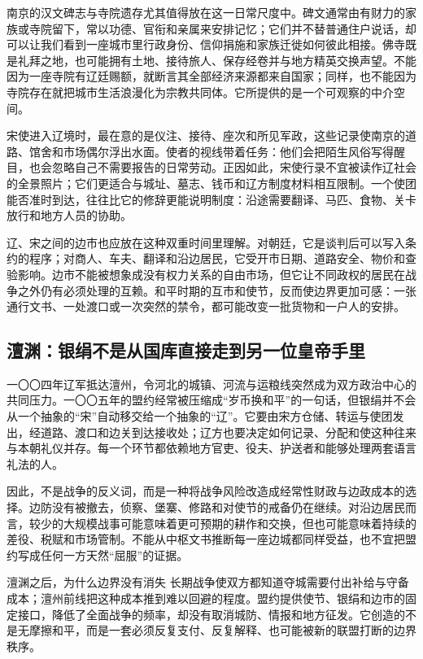 南京的汉文碑志与寺院遗存尤其值得放在这一日常尺度中。碑文通常由有财力的家族或寺院留下，常以功德、官衔和亲属来安排记忆；它们并不替普通住户说话，却可以让我们看到一座城市里行政身份、信仰捐施和家族迁徙如何彼此相接。佛寺既是礼拜之地，也可能拥有土地、接待旅人、保存经卷并与地方精英交换声望。不能因为一座寺院有辽廷赐额，就断言其全部经济来源都来自国家；同样，也不能因为寺院存在就把城市生活浪漫化为宗教共同体。它所提供的是一个可观察的中介空间。

宋使进入辽境时，最在意的是仪注、接待、座次和所见军政，这些记录使南京的道路、馆舍和市场偶尔浮出水面。使者的视线带着任务：他们会把陌生风俗写得醒目，也会忽略自己不需要报告的日常劳动。正因如此，宋使行录不宜被读作辽社会的全景照片；它们更适合与城址、墓志、钱币和辽方制度材料相互限制。一个使团能否准时到达，往往比它的修辞更能说明制度：沿途需要翻译、马匹、食物、关卡放行和地方人员的协助。

辽、宋之间的边市也应放在这种双重时间里理解。对朝廷，它是谈判后可以写入条约的程序；对商人、车夫、翻译和沿边居民，它受开市日期、道路安全、物价和查验影响。边市不能被想象成没有权力关系的自由市场，但它让不同政权的居民在战争之外仍有必须处理的互赖。和平时期的互市和使节，反而使边界更加可感：一张通行文书、一处渡口或一次突然的禁令，都可能改变一批货物和一户人的安排。

\subsection{澶渊：银绢不是从国库直接走到另一位皇帝手里}

一〇〇四年辽军抵达澶州，令河北的城镇、河流与运粮线突然成为双方政治中心的共同压力。一〇〇五年的盟约经常被压缩成“岁币换和平”的一句话，但银绢并不会从一个抽象的“宋”自动移交给一个抽象的“辽”。它要由宋方仓储、转运与使团发出，经道路、渡口和边关到达接收处；辽方也要决定如何记录、分配和使这种往来与本朝礼仪并存。每一个环节都依赖地方官吏、役夫、护送者和能够处理两套语言礼法的人。

因此，不是战争的反义词，而是一种将战争风险改造成经常性财政与边政成本的选择。边防没有被撤去，侦察、堡寨、修路和对使节的戒备仍在继续。对沿边居民而言，较少的大规模战事可能意味着更可预期的耕作和交换，但也可能意味着持续的差役、税赋和市场管制。不能从中枢文书推断每一座边城都同样受益，也不宜把盟约写成任何一方天然“屈服”的证据。

\begin{causalchain}{澶渊之后，为什么边界没有消失}
长期战争使双方都知道夺城需要付出补给与守备成本；澶州前线把这种成本推到难以回避的程度。盟约提供使节、银绢和边市的固定接口，降低了全面战争的频率，却没有取消城防、情报和地方征发。它创造的不是无摩擦和平，而是一套必须反复支付、反复解释、也可能被新的联盟打断的边界秩序。
\end{causalchain}

